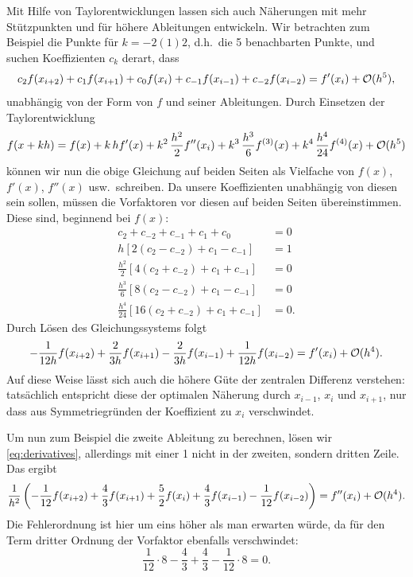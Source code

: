 Mit Hilfe von Taylorentwicklungen lassen sich auch Näherungen mit mehr
Stützpunkten und für höhere Ableitungen entwickeln.  Wir betrachten
zum Beispiel die Punkte für $k=-2(1)2$, d.h.\ die 5 benachbarten
Punkte, und suchen Koeffizienten $c_k$ derart, dass
\begin{equation}
  c_2 f(x_{i+2}) + c_1 f(x_{i+1})  + c_0 f(x_i) + c_{-1}f(x_{i-1}) +
  c_{-2}f(x_{i-2}) = f'(x_i) + \mathcal O(h^5),
\end{equation}
unabhängig von der Form von $f$ und seiner Ableitungen. Durch
Einsetzen der Taylorentwicklung
\begin{equation}
  f(x + k h) = f(x) + k\, hf'(x) + k^2\,\frac{h^2}{2} f''(x_i) +
  k^3\,\frac{h^3}{6}f^{(3)}(x) + k^4\,\frac{h^4}{24}f^{(4)}(x) + \mathcal O(h^5)
\end{equation}
können wir nun die obige Gleichung auf beiden Seiten als Vielfache von
$f(x)$, $f'(x)$, $f''(x)$ usw.\ schreiben. Da unsere Koeffizienten
unabhängig von diesen sein sollen, müssen die Vorfaktoren vor diesen
auf beiden Seiten übereinstimmen. Diese sind, beginnend bei $f(x)$:
\begin{align}
  \label{eq:derivatives}
  c_{2} + c_{-2} + c_{-1} + c_1 + c_0 &= 0\nonumber\\
  h\left[2 (c_{2} - c_{-2})  + c_{1} - c_{-1}\right] &= 1\nonumber\\
  \frac{h^2}{2}\left[4(c_{2} + c_{-2})  + c_{1} + c_{-1}\right] &= 0\nonumber\\
  \frac{h^3}{6}\left[8 (c_{2} - c_{-2})  + c_{1} - c_{-1}\right] &= 0\nonumber\\
  \frac{h^4}{24}\left[16 (c_{2} + c_{-2}) + c_{1} + c_{-1}\right] &= 0.
\end{align}
Durch Lösen des Gleichungssystems folgt
\begin{equation}
  \label{eq:4orderdiff}
  -\frac{1}{12h} f(x_{i+2}) + \frac{2}{3h} f(x_{i+1})  - \frac{2}{3h} f(x_{i-1}) +
  \frac{1}{12h}f(x_{i-2}) = f'(x_i) + \mathcal O(h^4).
\end{equation}
Auf diese Weise lässt sich auch die höhere Güte der zentralen
Differenz verstehen: tatsächlich entspricht diese der optimalen
Näherung durch $x_{i-1}$, $x_i$  und $x_{i+1}$, nur dass aus
Symmetriegründen der Koeffizient zu $x_i$ verschwindet.

Um nun zum Beispiel die zweite Ableitung zu berechnen, lösen wir
\eqref{eq:derivatives}, allerdings mit einer 1 nicht in der zweiten,
sondern dritten Zeile. Das ergibt
\begin{equation}
  \label{eq:3order2diff}
  \frac{1}{h^2}\left(-\frac{1}{12} f(x_{i+2}) + \frac{4}{3} f(x_{i+1}) +
  \frac{5}{2} f(x_i)  + \frac{4}{3} f(x_{i-1}) -
  \frac{1}{12}f(x_{i-2})\right) = f''(x_i) + \mathcal O(h^4).
\end{equation}
Die Fehlerordnung ist hier um eins höher als man erwarten würde, da für den
Term dritter Ordnung der Vorfaktor ebenfalls verschwindet:
\begin{equation}
  \frac{1}{12} \cdot 8 - \frac{4}{3} +
  \frac{4}{3} - \frac{1}{12}\cdot 8 = 0.
\end{equation}

